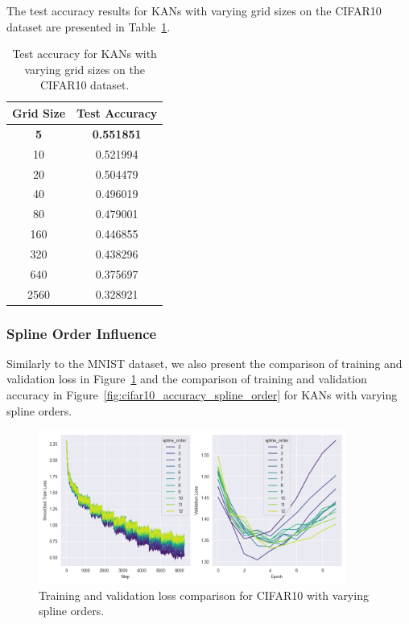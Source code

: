 \documentclass{article}
\begin{document}
The test accuracy results for KANs with varying grid sizes on the CIFAR10 dataset are presented in Table~\ref{tab:test_accuracy_grid_size_cifar10}.

\begin{table}[H]
    \centering
    \caption{Test accuracy for KANs with varying grid sizes on the CIFAR10 dataset.}
    \label{tab:test_accuracy_grid_size_cifar10}
    \begin{tabular}{|c|c|}
        \hline
        Grid Size & Test Accuracy \\
        \hline
        \textbf{5}    & \textbf{0.551851} \\
        10   & 0.521994 \\
        20   & 0.504479 \\
        40   & 0.496019 \\
        80   & 0.479001 \\
        160  & 0.446855 \\
        320  & 0.438296 \\
        640  & 0.375697 \\
        2560 & 0.328921 \\
        \hline
    \end{tabular}
\end{table}


\subsubsection{Spline Order Influence}\label{subsubsec:spline-order-influence-cifar10}

Similarly to the MNIST dataset, we also present the comparison of training and validation loss in Figure~\ref{fig:cifar10_loss_spline_order}
and the comparison of training and validation accuracy in Figure~\ref{fig:cifar10_accuracy_spline_order} for KANs with varying spline orders.

\begin{figure}[H]
    \centering
    \includegraphics[width=0.9\textwidth]{pics/cifar10_loss_spline_order}
    \caption{Training and validation loss comparison for CIFAR10 with varying spline orders.}
    \label{fig:cifar10_loss_spline_order}
\end{figure}
\end{document}
